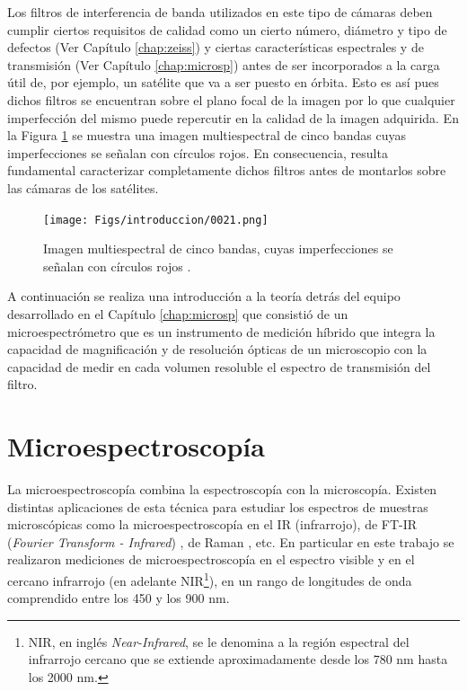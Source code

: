  Los filtros de interferencia de banda 
utilizados en este tipo de cámaras deben cumplir ciertos requisitos de calidad como un cierto número, diámetro y tipo de defectos (Ver Capítulo \ref{chap:zeiss}) y ciertas características espectrales y de transmisión (Ver Capítulo \ref{chap:microsp}) antes de ser 
incorporados a la carga útil de, por ejemplo, un satélite que va a ser puesto 
en 
órbita. Esto es así pues dichos filtros se encuentran sobre el plano focal de la imagen por lo que cualquier imperfección del mismo puede repercutir en la calidad de la imagen adquirida. En la Figura \ref{fig:speus} se muestra una imagen multiespectral de cinco bandas cuyas imperfecciones se señalan con círculos rojos. En consecuencia, resulta fundamental caracterizar completamente dichos filtros antes de montarlos sobre las cámaras de los satélites.

\begin{figure}[H]
	\centering
	\texttt{[image: Figs/introduccion/0021.png]}
	\caption{Imagen multiespectral de cinco bandas, cuyas imperfecciones se señalan con círculos rojos .}
	\label{fig:speus}
\end{figure}

A continuación se realiza una introducción a la teoría detrás del equipo desarrollado en el Capítulo \ref{chap:microsp} que consistió de un microespectrómetro que es un instrumento de medición híbrido que integra la capacidad de magnificación y de resolución ópticas de un microscopio con la capacidad de medir en cada volumen resoluble el espectro de transmisión del filtro.


\singlespacing
\section{Microespectroscopía}
\label{sec:microespp}


\hspace{0.5cm}La microespectroscopía combina la espectroscopía con la microscopía. Existen distintas aplicaciones de esta técnica para estudiar los espectros de muestras microscópicas como la microespectroscopía en el IR (infrarrojo)\cite{WALSH20071}, de FT-IR (\textit{Fourier Transform - Infrared}) \cite{kani}, de Raman \cite{defaria}, etc. En particular en este trabajo se realizaron mediciones de microespectroscopía en el espectro visible y en el cercano infrarrojo (en adelante NIR\footnote{NIR, en inglés \textit{Near-Infrared}, se le denomina a la región espectral del infrarrojo cercano que se extiende aproximadamente desde los 780 nm hasta los 2000 nm.}), en un rango de longitudes de onda comprendido entre los 450 y los 900 nm.


